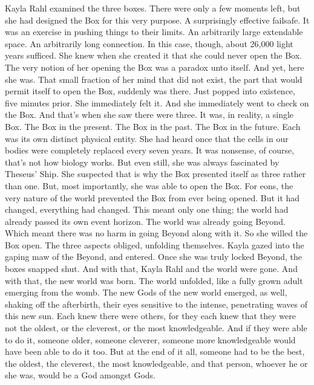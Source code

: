 Kayla Rahl examined the three boxes. There were only a few moments left, but she had designed the Box for this very purpose. A surprisingly effective failsafe. It was an exercise in pushing things to their limits. An arbitrarily large extendable space. An arbitrarily long connection. In this case, though, about 26,000 light years sufficed.
\SmallVSpace
She knew when she created it that she could never open the Box. The very notion of her opening the Box was a paradox unto itself. And yet, here she was. That small fraction of her mind that did not exist, the part that would permit itself to open the Box, suddenly was there. Just popped into existence, five minutes prior.
\SmallVSpace
She immediately felt it. And she immediately went to check on the Box. And that’s when she saw there were three. It was, in reality, a single Box. The Box in the present. The Box in the past. The Box in the future. Each was its own distinct physical entity. She had heard once that the cells in our bodies were completely replaced every seven years. It was nonsense, of course, that’s not how biology works. But even still, she was always fascinated by Theseus’ Ship. She suspected that is why the Box presented itself as three rather than one.
\SmallVSpace
But, most importantly, she was able to open the Box. For eons, the very nature of the world prevented the Box from ever being opened. But it had changed, everything had changed. This meant only one thing; the world had already passed its own event horizon. The world was already going Beyond.\\
Which meant there was no harm in going Beyond along with it.
\SmallVSpace
So she willed the Box open. The three aspects obliged, unfolding themselves. Kayla gazed into the gaping maw of the Beyond, and entered.
\SmallVSpace
Once she was truly locked Beyond, the boxes snapped shut.
\SmallVSpace
And with that, Kayla Rahl and the world were gone.
\simpleline
\SomeVSpace
And with that, the new world was born.
\SomeVSpace
The world unfolded, like a fully grown adult emerging from the womb. The new Gods of the new world emerged, as well, shaking off the afterbirth, their eyes sensitive to the intense, penetrating waves of this new sun.
\SmallVSpace
Each knew there were others, for they each knew that they were not the oldest, or the cleverest, or the most knowledgeable. And if they were able to do it, someone older, someone cleverer, someone more knowledgeable would have been able to do it too.
\SmallVSpace
But at the end of it all, someone had to be the best, the oldest, the cleverest, the most knowledgeable, and that person, whoever he or she was, would be a God amongst Gods.